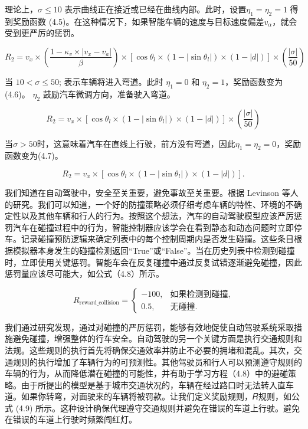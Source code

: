 理论上，\(𝜎 ≤ 10\) 表示曲线正在接近或已经在曲线内部。此时，设置\(𝜂_1 = 𝜂_2 = 1\) 得到奖励函数 (4.5)。在这种情况下，如果智能车辆的速度与目标速度偏差\(𝑣_𝛼\)，就会受到更严厉的惩罚。

\begin{equation}
	R_2 = v_x \times \left( \frac{1 - \kappa_v \times \lvert v_x - v_a \rvert}{\beta} \right) \times \left[ \cos \theta_l \times (1 - \lvert \sin \theta_l \rvert) \times (1 - \lvert d \rvert) \right] \times \left( \frac{\lvert \sigma \rvert}{50} \right)
\end{equation}

当 \(10 < 𝜎 ≤ 50\); 表示车辆将进入弯道。此时 \(𝜂_1 = 0\) 和 \(𝜂_2 = 1\)，奖励函数变为(4.6)。
\(𝜂_2\) 鼓励汽车微调方向，准备驶入弯道。

\begin{equation}
    R_2 = v_x \times \left[ \cos \theta_l \times (1 - |\sin \theta_l|) \times (1 - |d|) \right] \times \left( \frac{|\sigma|}{50} \right)
\end{equation}

当\(𝜎>50\)时，这意味着汽车在直线上行驶，前方没有弯道，因此\(𝜂_1=𝜂_2=0\)，奖励函数变为(4.7)。

\begin{equation}
	R_2 = v_x \times \left[ \cos \theta_l \times (1 - |\sin \theta_l|) \times (1 - |d|) \right].
\end{equation}

我们知道在自动驾驶中，安全至关重要，避免事故至关重要。根据 Levinson 等人的研究\cite{levinson2011towards}。我们可以知道，一个好的防撞策略必须仔细考虑车辆的特性、环境的不确定性以及其他车辆和行人的行为。按照这个想法，汽车的自动驾驶模型应该严厉惩罚汽车在碰撞过程中的行为，智能控制器应该学会在看到静态和动态问题时立即停车。记录碰撞预防逻辑来确定列表中的每个控制周期内是否发生碰撞。这些条目根据模拟器本身发生的碰撞检测返回“True”或“False”。当在历史列表中检测到碰撞时，立即使用关键惩罚。智能车会在反复碰撞中通过反复试错逐渐避免碰撞，因此惩罚量应该尽可能大，如公式（4.8）所示。

\begin{equation}
	R_{\text{reward\_collision}} = 
	\begin{cases} 
		-100, & \text{如果检测到碰撞}, \\ 
		0.5,  & \text{无碰撞}. 
	\end{cases}
\end{equation}

我们通过研究发现，通过对碰撞的严厉惩罚，能够有效地促使自动驾驶系统采取措施避免碰撞，增强整体的行车安全。自动驾驶的另一个关键方面是执行交通规则和法规。这些规则的执行首先将确保交通效率并防止不必要的拥堵和混乱。其次，交通规则的执行增加了车辆行为的可预测性。其他驾驶员和行人可以预测遵守规则的车辆的行为，从而降低潜在碰撞的可能性，并有助于学习方程（4.8）中的避碰策略。由于所提出的模型是基于城市交通状况的，车辆在经过路口时无法转入直车道。如果你转弯，对面驶来的车辆将被罚款。让我们定义奖励规则，𝑅规则，如公式 (4.9) 所示。这种设计确保代理遵守交通规则并避免在错误的车道上行驶。避免在错误的车道上行驶时频繁闯红灯。

